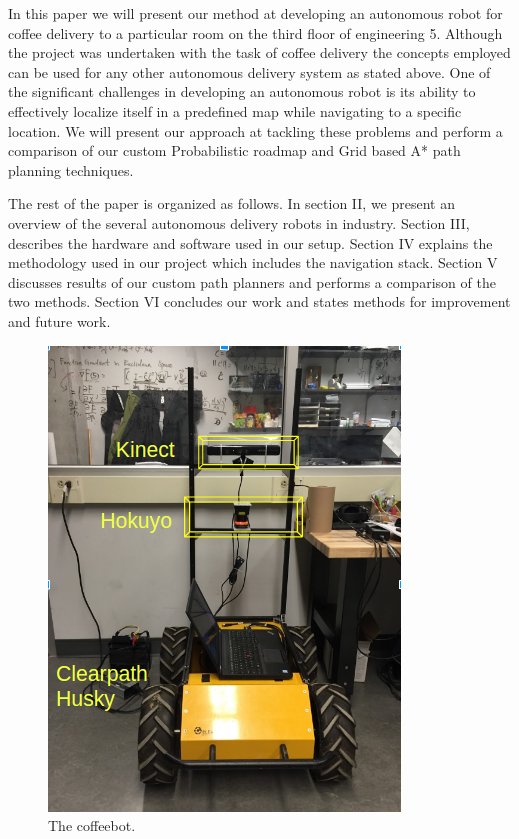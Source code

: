 \documentclass[letterpaper, 10 pt, conference]{ieeeconf}  %
\begin{document}
In this paper we will present our method at developing an autonomous robot for coffee delivery to a particular room on the third floor of engineering 5. Although the project was undertaken with the task of coffee delivery the concepts employed can be used for any other autonomous delivery system as stated above. One of the significant challenges in developing an autonomous robot is its ability to effectively localize itself in a predefined map while navigating to a specific location. We will present our approach at tackling these problems and perform a comparison of our custom Probabilistic roadmap and Grid based A* path planning techniques.

The rest of the paper is organized as follows. In section II, we present an overview of the several autonomous delivery robots in industry. Section III, describes the hardware and software used in our setup. Section IV explains the methodology used in our project which includes the navigation stack. Section V discusses results of our custom path planners and performs a comparison of the two methods. Section VI concludes our work and states methods for improvement and future work.

\begin{figure}[!ht]
	\centering
	\includegraphics[width=1.0\columnwidth]{Figures/hardware_setup}
	\caption{The coffeebot.}
	\label{hardware}
\end{figure}
\end{document}
